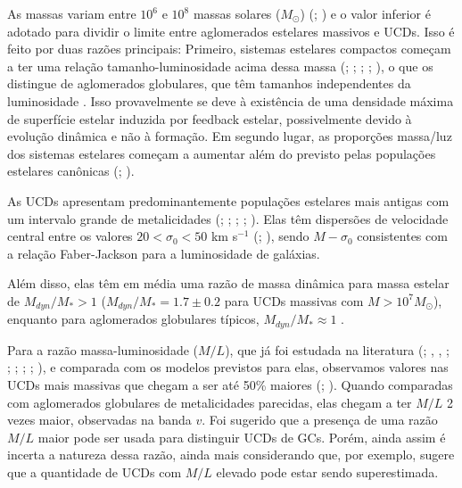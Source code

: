 As massas variam entre $10^6$ e $10^8$ massas solares ($M_{\odot}$) (\citealp{Mieske_2008_1}; \citealp{Misgeld_2011_2}) e o valor inferior é adotado para dividir o limite entre aglomerados estelares massivos e UCDs. Isso é feito por duas razões principais: Primeiro, sistemas estelares compactos começam a ter uma relação tamanho-luminosidade acima dessa massa (\citealp{Hasegan_2005}; \citealp{Cote_2006}; \citealp{Rejkuba_2007}; \citealp{Evstigneeva_2008}; \citealp{Norris_2011}), o que os distingue de aglomerados globulares, que têm tamanhos independentes da luminosidade \citep{Jornan_2005}. Isso provavelmente se deve à existência de uma densidade máxima de superfície estelar induzida por feedback estelar, possivelmente devido à evolução dinâmica e não à formação. Em segundo lugar, as proporções massa/luz dos sistemas estelares começam a aumentar além do previsto pelas populações estelares canônicas (\citealp{Hasegan_2005}; \citealp{Dabringhausen_2008}).

As UCDs apresentam predominantemente populações estelares mais antigas com um intervalo grande de metalicidades (\citealp{Evstigneeva_2009}; \citealp{Janz_2015}; \citealp{Zhang_2018}; \citealp{Forbes_2020}; \citealp{Fahrion_2020}). Elas têm dispersões de velocidade central entre os valores $20 < \sigma_0 < 50$ km s$^{-1}$ (\citealp{Hasegan_2005}; \citealp{Mieske_2008_1}), sendo $M-\sigma_0$ consistentes com a relação Faber-Jackson para a luminosidade de galáxias.

Além disso, elas têm em média uma razão de massa dinâmica para massa estelar de $M_{dyn}/M_* > 1$ ($M_{dyn}/M_* = 1.7 \pm 0.2$ para UCDs massivas com $M > 10^7 M_{\odot}$), enquanto para aglomerados globulares típicos, $M_{dyn}/M_* \approx 1$ \citep{Mieske_2013}.

Para a razão massa-luminosidade ($M/L$), que já foi estudada na literatura (\citealp{Hasegan_2005}; \citealp{Dabringhausen_2009}, \citeyear{Dabringhausen_2010}, \citeyear{Dabringhausen_2012}; \citealp{Baumgardt_2008}; \citealp{Mieske_2008_2}; \citealp{Taylor_2010}; \citealp{Frank_2011}; \citealp{Strader_2013}), e comparada com os modelos previstos para elas, observamos valores nas UCDs mais massivas que chegam a ser até 50\% maiores (\citealp{Hasegan_2005}; \citealp{Mieske_2008_2}). Quando comparadas com aglomerados globulares de metalicidades parecidas, elas chegam a ter $M/L$ 2 vezes maior, observadas na banda $v$. Foi sugerido que a presença de uma razão $M/L$ maior pode ser usada para distinguir UCDs de GCs. Porém, ainda assim é incerta a natureza dessa razão, ainda mais considerando que, por exemplo, \cite{Voggel_2018} sugere que a quantidade de UCDs com $M/L$ elevado pode estar sendo superestimada.

